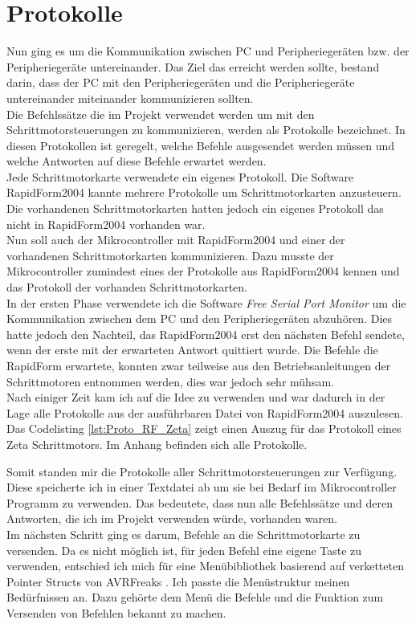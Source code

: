 \section{Protokolle}
Nun ging es um die Kommunikation zwischen PC und Peripheriegeräten bzw. der Peripheriegeräte untereinander.
Das Ziel das erreicht werden sollte, bestand darin, dass der PC mit den Peripheriegeräten und die Peripheriegeräte untereinander miteinander kommunizieren sollten.\\
Die Befehlssätze die im Projekt verwendet werden um mit den Schrittmotorsteuerungen zu kommunizieren, werden als Protokolle bezeichnet. In diesen Protokollen ist geregelt, welche Befehle ausgesendet werden müssen und welche Antworten auf diese Befehle erwartet werden.\\
Jede Schrittmotorkarte verwendete ein eigenes Protokoll.
Die Software RapidForm2004 kannte mehrere Protokolle um Schrittmotorkarten anzusteuern. Die vorhandenen Schrittmotorkarten hatten jedoch ein eigenes Protokoll das nicht in RapidForm2004 vorhanden war.\\
Nun soll auch der Mikrocontroller mit RapidForm2004 und einer der vorhandenen Schrittmotorkarten kommunizieren. 
Dazu musste der Mikrocontroller zumindest eines der Protokolle aus RapidForm2004 kennen und das Protokoll der vorhanden Schrittmotorkarten.\\
In der ersten Phase verwendete ich die Software \emph{Free Serial Port Monitor} um die Kommunikation zwischen dem PC und den Peripheriegeräten abzuhören. Dies hatte jedoch den Nachteil, das RapidForm2004 erst den nächsten Befehl sendete, wenn der erste mit der erwarteten Antwort quittiert wurde. Die Befehle die RapidForm erwartete, konnten zwar teilweise aus den Betriebsanleitungen der Schrittmotoren entnommen werden, dies war jedoch sehr mühsam.\\
Nach einiger Zeit kam ich auf die Idee  zu verwenden und war dadurch in der Lage alle Protokolle aus der ausführbaren Datei von RapidForm2004 auszulesen.\\
Das Codelisting \ref{lst:Proto_RF_Zeta} zeigt einen Auszug für das Protokoll eines Zeta Schrittmotors. Im Anhang befinden sich alle Protokolle.
\lstset{language=C, basicstyle=\footnotesize, showstringspaces=false, tabsize=8}

Somit standen mir die Protokolle aller Schrittmotorsteuerungen zur Verfügung. Diese speicherte ich in einer Textdatei ab um sie bei Bedarf im Mikrocontroller Programm zu verwenden. Das bedeutete, dass nun alle Befehlssätze und deren Antworten, die ich im Projekt verwenden würde, vorhanden waren.\\
Im nächsten Schritt ging es darum, Befehle an die Schrittmotorkarte zu versenden. Da es nicht möglich ist, für jeden Befehl eine eigene Taste zu verwenden, entschied ich mich für eine Menübibliothek  basierend auf verketteten Pointer Structs von AVRFreaks \cite{AVRFreaks:Menu}.
Ich passte die Menüstruktur meinen Bedürfnissen an. Dazu gehörte dem Menü die Befehle und die Funktion zum Versenden von Befehlen bekannt zu machen.





